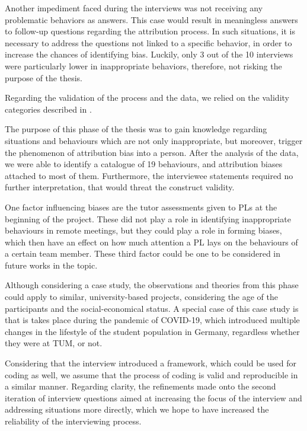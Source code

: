 Another impediment faced during the interviews was not receiving any problematic behaviors as answers. This case would result in meaningless answers to follow-up questions regarding the attribution process. In such situations, it is necessary to address the questions not linked to a specific behavior, in order to increase the chances of identifying bias. Luckily, only 3 out of the 10 interviews were particularly lower in inappropriate behaviors, therefore, not risking the purpose of the thesis.

Regarding the validation of the process and the data, we relied on the validity categories described in \cite{Runeson2012}.

The purpose of this phase of the thesis was to gain knowledge regarding situations and behaviours which are not only inappropriate, but moreover, trigger the phenomenon of attribution bias into a person. After the analysis of the data, we were able to identify a catalogue of 19 behaviours, and attribution biases attached to most of them. Furthermore, the interviewee statements required no further interpretation, that would threat the construct validity.

One factor influencing biases are the tutor assessments given to PLs at the beginning of the project. These did not play a role in identifying inappropriate behaviours in remote meetings, but they could play a role in forming biases, which then have an effect on how much attention a PL lays on the behaviours of a certain team member. These third factor could be one to be considered in future works in the topic.

Although considering a case study, the observations and theories from this phase could apply to similar, university-based projects, considering the age of the participants and the social-economical status. A special case of this case study is that is takes place during the pandemic of COVID-19, which introduced multiple changes in the lifestyle of the student population in Germany, regardless whether they were at TUM, or not.

Considering that the interview introduced a framework, which could be used for coding as well, we assume that the process of coding is valid and reproducible in a similar manner. Regarding clarity, the refinements made onto the second iteration of interview questions aimed at increasing the focus of the interview and addressing situations more directly, which we hope to have increased the reliability of the interviewing process.  